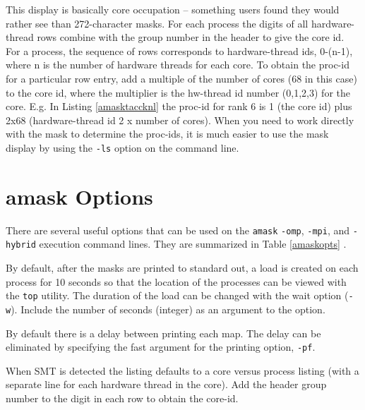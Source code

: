 \documentclass[10pt,a4paper]{report}
\begin{document}
This display is basically core occupation -- something users found they would rather see than 272-character masks.
For each process the digits of all hardware-thread rows combine with the  group number in the header to give the
core id. For a process, the sequence of rows corresponds to hardware-thread ids, 0-(n-1), where n is the number of hardware 
threads for each core. To obtain the proc-id for a particular row entry, add a multiple of the number of cores (68 in this case)
to the core id, where the multiplier is the hw-thread id number (0,1,2,3) for the core.  E.g. In Listing \ref{amasktaccknl} the proc-id for rank 6 is 1 (the core id)
plus 2x68 (hardware-thread id 2 x number of cores). 
When you need to work directly with the mask to determine the proc-ids, it is much easier 
to use the mask display by using the \verb+-ls+ option on the command line. 

\clearpage



\section{amask Options}
There are several useful options that can be used on the \verb+amask+ \verb+-omp+, \verb+-mpi+, and
\verb+-hybrid+ execution command lines.  They are summarized in Table \ref{amaskopts} .

By default, after the masks are printed to standard out, a load is created on each process
for 10 seconds so that the location of the processes can be viewed with the \verb+top+ 
utility. The duration of the load can be changed with the wait option (\verb+-w+). Include
the number of seconds (integer) as an argument to the option. 

By default there is a delay between printing each map. The delay can be eliminated by specifying
the fast argument for the printing option, \verb+-pf+.

When SMT is detected the listing defaults to a core versus process listing (with a
separate line for each hardware thread in the core).  
Add the header group number to the digit in each row to obtain the core-id.
\end{document}
